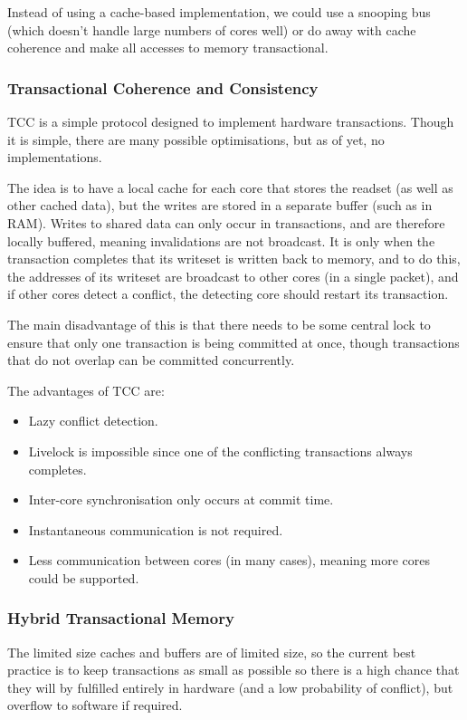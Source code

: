 Instead of using a cache-based implementation, we could use a snooping
bus (which doesn't handle large numbers of cores well) or do away with
cache coherence and make all accesses to memory transactional.

\subsubsection{Transactional Coherence and Consistency}

TCC is a simple protocol designed to implement hardware
transactions. Though it is simple, there are many possible
optimisations, but as of yet, no implementations.

The idea is to have a local cache for each core that stores the
readset (as well as other cached data), but the writes are stored in a
separate buffer (such as in RAM). Writes to shared data can only occur
in transactions, and are therefore locally buffered, meaning
invalidations are not broadcast. It is only when the transaction
completes that its writeset is written back to memory, and to do this,
the addresses of its writeset are broadcast to other cores (in a
single packet), and if other cores detect a conflict, the detecting
core should restart its transaction.

The main disadvantage of this is that there needs to be some central
lock to ensure that only one transaction is being committed at once,
though transactions that do not overlap can be committed concurrently.

The advantages of TCC are:

\begin{itemize}
\item Lazy conflict detection.
\item Livelock is impossible since one of the conflicting transactions always completes.
\item Inter-core synchronisation only occurs at commit time.
\item Instantaneous communication is not required.
\item Less communication between cores (in many cases), meaning more cores could be supported.
\end{itemize}

\subsubsection{Hybrid Transactional Memory}

The limited size caches and buffers are of limited size, so the
current best practice is to keep transactions as small as possible so
there is a high chance that they will by fulfilled entirely in
hardware (and a low probability of conflict), but overflow to software
if required.


